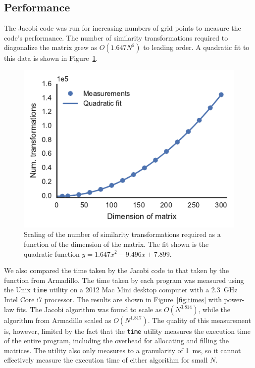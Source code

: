 \documentclass[aps,prc,reprint]{revtex4-1}
\begin{document}
    \subsection{Performance}
    \label{sub:perf}
        The Jacobi code was run for increasing numbers of grid points to measure the code's performance. The number of similarity transformations required to diagonalize the matrix grew as $O(1.647 N^2)$ to leading order. A quadratic fit to this data is shown in Figure~\ref{fig:transformScaling}.

        \begin{figure}
            \includegraphics{transformScaling.pdf}
            \caption{Scaling of the number of similarity transformations required as a function of the dimension of the matrix. The fit shown is the quadratic function $y = \num{1.647}x^2 - \num{9.496} x + \num{7.899}.$}
            \label{fig:transformScaling}
        \end{figure}

        We also compared the time taken by the Jacobi code to that taken by the function from Armadillo. The time taken by each program was measured using the Unix \texttt{time} utility on a 2012 Mac Mini desktop computer with a \SI{2.3}{GHz} Intel Core i7 processor. The results are shown in Figure~\ref{fig:times} with power-law fits. The Jacobi algorithm was found to scale as $O(N^{3.814})$, while the algorithm from Armadillo scaled as $O(N^{1.817})$. The quality of this measurement is, however, limited by the fact that the \texttt{time} utility measures the execution time of the entire program, including the overhead for allocating and filling the matrices. The utility also only measures to a granularity of \SI{1}{ms}, so it cannot effectively measure the execution time of either algorithm for small $N$.
\end{document}
